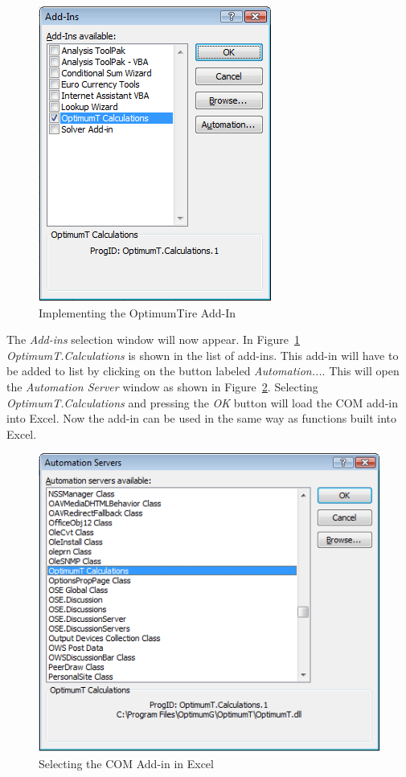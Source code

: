 \begin{figure}[H]
	\centering
		\includegraphics[width=.4\textwidth]{ImplementingAddin.png}
	\caption{Implementing the OptimumTire Add-In}
	\label{fig:ImplementingAddin}
\end{figure}


The \textit{Add-ins} selection window will now appear. In Figure~\ref{fig:ImplementingAddin} \textit{OptimumT.Calculations} is shown in the list of add-ins. This add-in will have to be added to list by clicking on the button labeled \textit{Automation...}. This will open the \textit{Automation Server} window as shown in Figure~\ref{fig:AutomationServer}. Selecting \textit{OptimumT.Calculations} and pressing the \textit{OK} button will load the COM add-in into Excel. Now the add-in can be used in the same way as functions built into Excel.

\begin{figure}[H]
	\centering
		\includegraphics[width=.9\textwidth]{AutomationServer.png}
	\caption{Selecting the COM Add-in in Excel }
	\label{fig:AutomationServer}
\end{figure}


